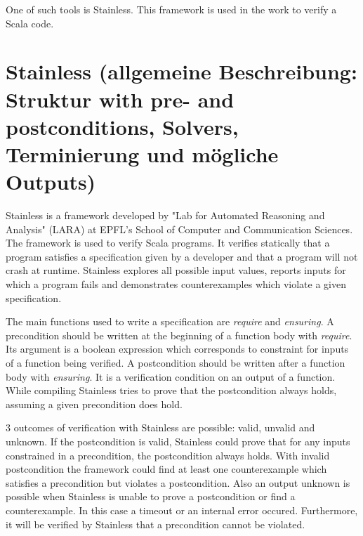 One of such tools is Stainless. This framework is used in the work to verify a Scala code.

 


\section{Stainless (allgemeine Beschreibung: Struktur with pre- and postconditions, Solvers, Terminierung und mögliche Outputs)}
\label{sec:stainless}


Stainless is a framework developed by "Lab for Automated Reasoning and Analysis" (LARA) at EPFL's School of Computer and Communication Sciences. The framework is used to verify Scala programs.
It verifies statically that a program satisfies a specification given by a developer and that a program will not crash at runtime.
Stainless explores all possible input values, reports inputs for which a program fails and demonstrates counterexamples which violate a given specification.\cite{Stainless:introduction}

The main functions used to write a specification are \textit{require} and \textit{ensuring}. 
A precondition should be written at the beginning of a function body with \textit{require}. Its argument is a boolean expression which corresponds to constraint for inputs of a function being verified.
A postcondition should be written after a function body with  \textit{ensuring}. It is a verification condition on an output of a function.
While compiling Stainless tries to prove that the postcondition always holds, assuming a given precondition does hold.\cite{Stainless:introduction}

3 outcomes of verification with Stainless are possible: valid, unvalid and unknown. 
If the postcondition is valid, Stainless could prove that for any inputs constrained in a precondition, the postcondition always holds.
With invalid postcondition the framework could find at least one counterexample which satisfies a precondition but violates a postcondition.
Also an output unknown is possible when Stainless is unable to prove a postcondition or find a counterexample. In this case a timeout or an internal error occured.
Furthermore, it will be verified by Stainless that a precondition cannot be violated.\cite{Stainless:introduction}

